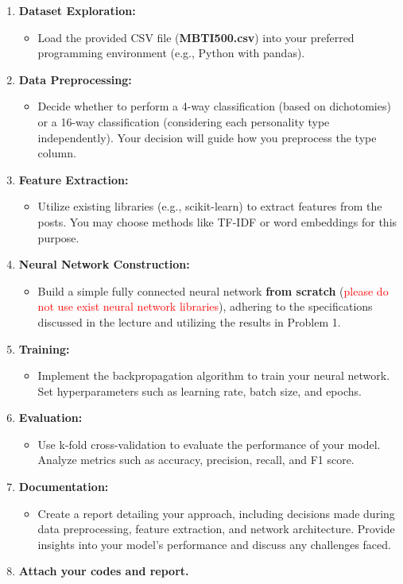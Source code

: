 \documentclass{article}
\begin{document}
\begin{enumerate}
    \item \textbf{Dataset Exploration:}
        \begin{itemize}
            \item Load the provided CSV file (\textbf{MBTI500.csv}) into your preferred programming environment (e.g., Python with pandas).
        \end{itemize}
    \item \textbf{Data Preprocessing:}
        \begin{itemize}
            \item Decide whether to perform a 4-way classification (based on dichotomies) or a 16-way classification (considering each personality type independently). Your decision will guide how you preprocess the type column.
        \end{itemize}
    \item \textbf{Feature Extraction:}
        \begin{itemize}
            \item Utilize existing libraries (e.g., scikit-learn) to extract features from the posts. You may choose methods like TF-IDF or word embeddings for this purpose.
        \end{itemize}
    \item \textbf{Neural Network Construction:}
        \begin{itemize}
            \item Build a simple fully connected neural network \textbf{from scratch} (\textcolor{red}{please do not use exist neural network libraries}), adhering to the specifications discussed in the lecture and utilizing the results in Problem 1.
        \end{itemize}
    \item \textbf{Training:}
        \begin{itemize}
            \item Implement the backpropagation algorithm to train your neural network. Set hyperparameters such as learning rate, batch size, and epochs.
        \end{itemize}
    \item \textbf{Evaluation:}
        \begin{itemize}
            \item Use k-fold cross-validation to evaluate the performance of your model. Analyze metrics such as accuracy, precision, recall, and F1 score.
        \end{itemize}
    \item \textbf{Documentation:}
        \begin{itemize}
            \item Create a report detailing your approach, including decisions made during data preprocessing, feature extraction, and network architecture. Provide insights into your model's performance and discuss any challenges faced.
        \end{itemize}
    \item \textbf{Attach your codes and report.}
\end{enumerate}
\end{document}
